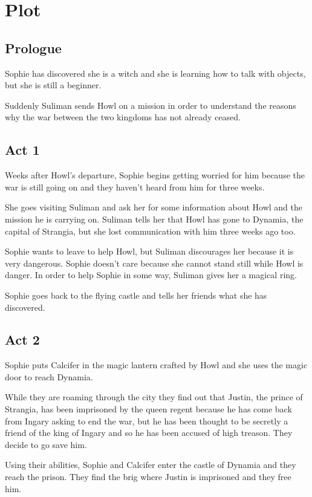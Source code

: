 \section{Plot}

\subsection*{Prologue}
Sophie has discovered she is a witch and she is learning how to talk with objects, but she is still a beginner.

Suddenly Suliman sends Howl on a mission in order to understand the reasons why the war between the two kingdoms has not already ceased.

\subsection*{Act 1}
Weeks after Howl's departure, Sophie begins getting worried for him because the war is still going on and they haven't heard from him for three weeks.

She goes visiting Suliman and ask her for some information about Howl and the mission he is carrying on. Suliman tells her that Howl has gone to Dynamia, the capital of Strangia, but she lost communication with him three weeks ago too.

Sophie wants to leave to help Howl, but Suliman discourages her because it is very dangerous. Sophie doesn't care because she cannot stand still while Howl is danger. In order to help Sophie in some way, Suliman gives her a magical ring.

Sophie goes back to the flying castle and tells her friends what she has discovered.

\subsection*{Act 2}
Sophie puts Calcifer in the magic lantern crafted by Howl and she uses the magic door to reach Dynamia.

While they are roaming through the city they find out that Justin, the prince of Strangia, has been imprisoned by the queen regent because he has come back from Ingary asking to end the war, but he has been thought to be secretly a friend of the king of Ingary and so he has been accused of high treason. They decide to go save him.

Using their abilities, Sophie and Calcifer enter the castle of Dynamia and they reach the prison. They find the brig where Justin is imprisoned and they free him.

